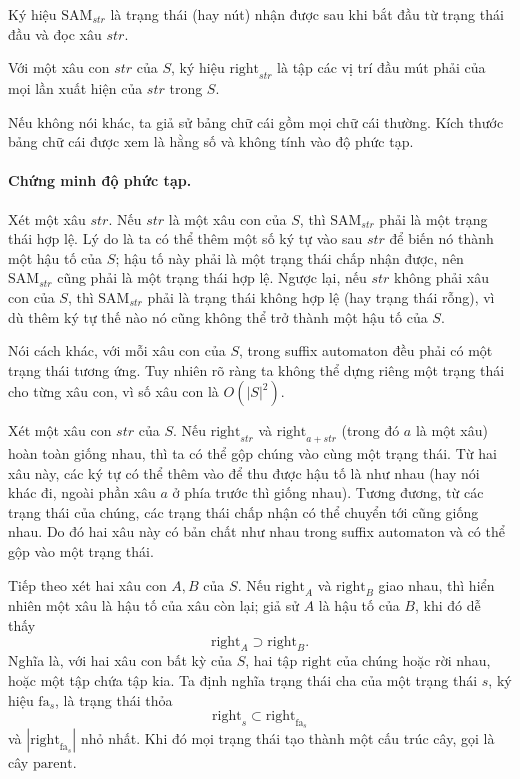\documentclass[11pt]{article}
\begin{document}
Ký hiệu \(\mathrm{SAM}_{str}\) là trạng thái (hay nút) nhận được sau khi bắt đầu
từ trạng thái đầu và đọc xâu \(str\).

Với một xâu con \(str\) của \(S\), ký hiệu \(\mathrm{right}_{str}\) là tập các
vị trí đầu mút phải của mọi lần xuất hiện của \(str\) trong \(S\).

Nếu không nói khác, ta giả sử bảng chữ cái gồm mọi chữ cái thường. Kích thước
bảng chữ cái được xem là hằng số và không tính vào độ phức tạp.

\paragraph{Chứng minh độ phức tạp.}
Xét một xâu \(str\). Nếu \(str\) là một xâu con của \(S\), thì
\(\mathrm{SAM}_{str}\) phải là một trạng thái hợp lệ. Lý do là ta có thể thêm
một số ký tự vào sau \(str\) để biến nó thành một hậu tố của \(S\); hậu tố này
phải là một trạng thái chấp nhận được, nên \(\mathrm{SAM}_{str}\) cũng phải là
một trạng thái hợp lệ. Ngược lại, nếu \(str\) không phải xâu con của \(S\), thì
\(\mathrm{SAM}_{str}\) phải là trạng thái không hợp lệ (hay trạng thái rỗng),
vì dù thêm ký tự thế nào nó cũng không thể trở thành một hậu tố của \(S\).

Nói cách khác, với mỗi xâu con của \(S\), trong suffix automaton đều phải có
một trạng thái tương ứng. Tuy nhiên rõ ràng ta không thể dựng riêng một trạng
thái cho từng xâu con, vì số xâu con là \(O(|S|^2)\).

Xét một xâu con \(str\) của \(S\). Nếu \(\mathrm{right}_{str}\) và
\(\mathrm{right}_{a+str}\) (trong đó \(a\) là một xâu) hoàn toàn giống nhau, thì
ta có thể gộp chúng vào cùng một trạng thái. Từ hai xâu này, các ký tự có thể
thêm vào để thu được hậu tố là như nhau (hay nói khác đi, ngoài phần xâu \(a\)
ở phía trước thì giống nhau). Tương đương, từ các trạng thái của chúng, các
trạng thái chấp nhận có thể chuyển tới cũng giống nhau. Do đó hai xâu này có
bản chất như nhau trong suffix automaton và có thể gộp vào một trạng thái.

Tiếp theo xét hai xâu con \(A,B\) của \(S\). Nếu \(\mathrm{right}_A\) và
\(\mathrm{right}_B\) giao nhau, thì hiển nhiên một xâu là hậu tố của xâu còn
lại; giả sử \(A\) là hậu tố của \(B\), khi đó dễ thấy
\[
  \mathrm{right}_A \supset \mathrm{right}_B.
\]
Nghĩa là, với hai xâu con bất kỳ của \(S\), hai tập \(\mathrm{right}\) của
chúng hoặc rời nhau, hoặc một tập chứa tập kia. Ta định nghĩa trạng thái cha
của một trạng thái \(s\), ký hiệu \(\mathrm{fa}_s\), là trạng thái thỏa
\[
  \mathrm{right}_s \subset \mathrm{right}_{\mathrm{fa}_s}
\]
và \(|\mathrm{right}_{\mathrm{fa}_s}|\) nhỏ nhất. Khi đó mọi trạng thái tạo
thành một cấu trúc cây, gọi là cây \(\mathrm{parent}\).
\end{document}
